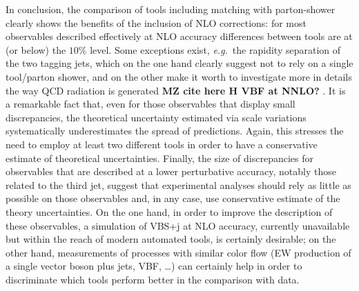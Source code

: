 In conclusion, the comparison of tools including matching with parton-shower clearly shows the benefits of the inclusion of NLO corrections: for most observables described
effectively at NLO accuracy differences between tools are at (or below) the $10\%$ level. 
Some exceptions exist, \emph{e.g.}\ the rapidity separation of the two tagging jets, which
on the one hand clearly suggest not to rely on a single tool/parton shower, and on the other make it worth to investigate more in details the way QCD radiation is
generated {\bf MZ cite here H VBF at NNLO?} . It is a remarkable fact that, even for those observables that display small discrepancies,
the theoretical uncertainty estimated via scale variations systematically underestimates the spread of predictions. Again, this stresses the need
 to employ at least two different tools in order to have a conservative estimate of theoretical uncertainties. Finally, the size of discrepancies for observables that are described at a lower perturbative accuracy, notably those related to the third jet, suggest that
experimental analyses should rely as little as possible on those observables and, in any case, use conservative estimate of the theory 
uncertainties. On the one hand, in order to improve the
description of these observables, a simulation of VBS+j at NLO accuracy, currently unavailable but within the reach of modern 
automated tools, is certainly desirable; on the other hand, measurements of processes with similar 
color flow (EW production of a single vector boson plus jets,
 VBF, \ldots) can certainly help in order to discriminate which tools perform better in the comparison with data. 

